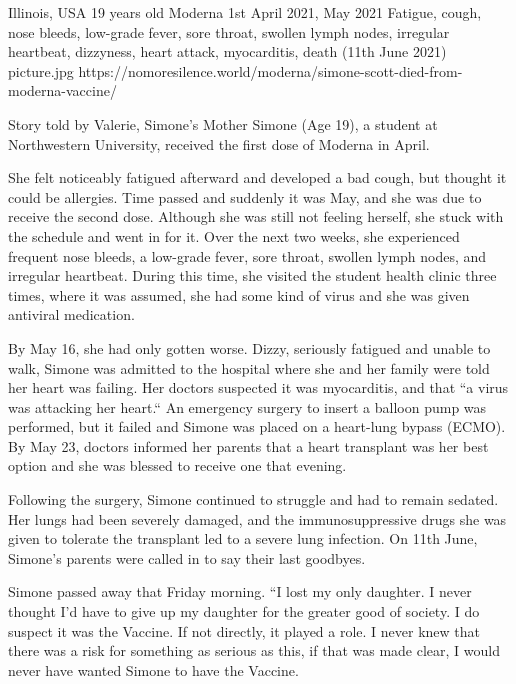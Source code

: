           {Illinois, USA}
          {19 years old}
          {Moderna}
          {1st April 2021, May 2021}
          {Fatigue, cough, nose bleeds, low-grade fever, sore throat, swollen lymph nodes, irregular heartbeat, dizzyness, heart attack, myocarditis, death (11th June 2021)}
          {picture.jpg}
          {https://nomoresilence.world/moderna/simone-scott-died-from-moderna-vaccine/}
          {

Story told by Valerie, Simone's Mother Simone (Age 19), a student at
Northwestern University, received the first dose of Moderna in April.

She felt noticeably fatigued afterward and developed a bad cough, but thought it
could be allergies. Time passed and suddenly it was May, and she was due to
receive the second dose. Although she was still not feeling herself, she stuck
with the schedule and went in for it. Over the next two weeks, she experienced
frequent nose bleeds, a low-grade fever, sore throat, swollen lymph nodes, and
irregular heartbeat. During this time, she visited the student health clinic
three times, where it was assumed, she had some kind of virus and she was given
antiviral medication.

By May 16, she had only gotten worse. Dizzy, seriously fatigued and unable to
walk, Simone was admitted to the hospital where she and her family were told her
heart was failing. Her doctors suspected it was myocarditis, and that “a virus
was attacking her heart.“ An emergency surgery to insert a balloon pump was
performed, but it failed and Simone was placed on a heart-lung bypass (ECMO). By
May 23, doctors informed her parents that a heart transplant was her best option
and she was blessed to receive one that evening.

Following the surgery, Simone continued to struggle and had to remain
sedated. Her lungs had been severely damaged, and the immunosuppressive drugs
she was given to tolerate the transplant led to a severe lung infection. On 11th
June, Simone's parents were called in to say their last goodbyes.

Simone passed away that Friday morning. “I lost my only daughter. I never
thought I’d have to give up my daughter for the greater good of society. I do
suspect it was the Vaccine. If not directly, it played a role. I never knew that
there was a risk for something as serious as this, if that was made clear, I
would never have wanted Simone to have the Vaccine.

}
